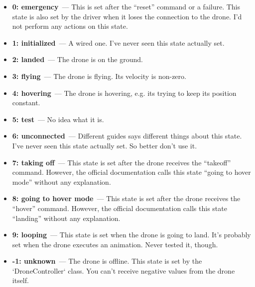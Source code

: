 \documentclass[12pt]{article}
\begin{document}
    \begin{itemize}

        \item {\bf0: emergency}~--- This is set after the ``reset'' command
        or a failure.
        This state is also set by the driver when it
        loses the connection to the drone. I'd not perform any actions on this state.

        \item {\bf1: initialized}~--- A wired one. I've never seen this state actually set.

        \item {\bf2: landed}~--- The drone is on the ground.

        \item {\bf3: flying}~--- The drone is flying. Its velocity is non-zero.

        \item {\bf4: hovering}~--- The drone is hovering, e.g. its trying to keep its position constant.

        \item {\bf5: test}~--- No idea what it is.

        \item {\bf6: unconnected}~--- Different guides says different things about this state.
        I've never seen this state actually set. So better don't use it.

        \item {\bf7: taking off}~--- This state is set after the drone receives the ``takeoff'' command.
        However, the official documentation calls this state
        ``going to hover mode'' without any explanation.

        \item {\bf8: going to hover mode}~--- This state is set after the drone receives the ``hover'' command.
        However, the official documentation calls this state
        ``landing'' without any explanation.

        \item {\bf9: looping}~--- This state is set when the drone is going to land.
        It's probably set when the drone executes an animation.
        Never tested it, though.

        \item {\bf-1: unknown}~--- The drone is offline. This state is set
        by the `DroneController` class. You can't receive negative values
        from the drone itself.

    \end{itemize}
\end{document}
